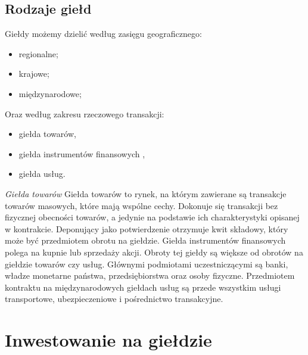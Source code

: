 \documentclass{report}
\begin{document}
\section {Rodzaje giełd}
Giełdy możemy dzielić według zasięgu geograficznego:
\begin{itemize}
\item regionalne;
\item krajowe;
\item międzynarodowe;
\end{itemize}
Oraz według zakresu rzeczowego transakcji:
\begin{itemize}
\item giełda towarów,
\item giełda instrumentów finansowych ,
\item giełda usług.
\end{itemize}
{\Large \textit{Giełda towarów}}
\newline Giełda towarów to rynek, na którym zawierane są transakcje towarów masowych, które mają wspólne cechy. Dokonuje się transakcji bez fizycznej obecności towarów, a jedynie na podstawie ich charakterystyki opisanej w kontrakcie. Deponujący jako potwierdzenie otrzymuje kwit składowy, który może być przedmiotem obrotu na giełdzie.
\newline Giełda instrumentów finansowych polega na kupnie lub sprzedaży akcji. Obroty tej giełdy są większe od obrotów na giełdzie towarów czy usług. Głównymi podmiotami uczestniczącymi są banki, władze monetarne państwa, przedsiębiorstwa oraz osoby fizyczne.
\newline Przedmiotem kontraktu na międzynarodowych giełdach usług są przede wszystkim usługi transportowe, ubezpieczeniowe i pośrednictwo transakcyjne.
\newpage
\chapter{Inwestowanie na giełdzie}
\end{document}
